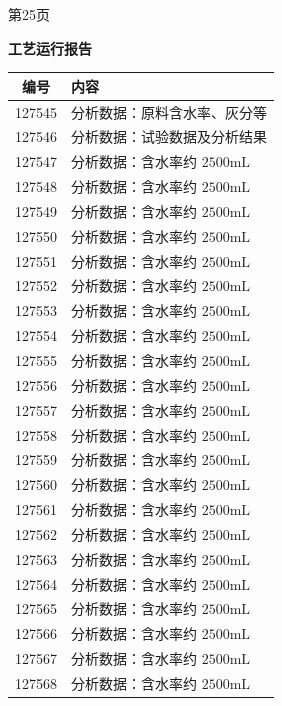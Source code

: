 \documentclass[UTF8,10pt,a4paper,fontset=fandol]{ctexart}
\begin{document}
\begin{center}
\begin{minipage}[t]{0.47\textwidth}
\smallskip
第25页
\end{minipage}
\hfill
\begin{minipage}[t]{0.47\textwidth}
\centering
\textbf{工艺运行报告}

\smallskip
\begin{tabularx}{\linewidth}{|c|X|}
\hline
\textbf{编号} & \textbf{内容} \\ \hline
127545 & 分析数据：原料含水率、灰分等 \\ \hline
127546 & 分析数据：试验数据及分析结果 \\ \hline
127547 & 分析数据：含水率约 $2500\mathrm{mL}$ \\ \hline
127548 & 分析数据：含水率约 $2500\mathrm{mL}$ \\ \hline
127549 & 分析数据：含水率约 $2500\mathrm{mL}$ \\ \hline
127550 & 分析数据：含水率约 $2500\mathrm{mL}$ \\ \hline
127551 & 分析数据：含水率约 $2500\mathrm{mL}$ \\ \hline
127552 & 分析数据：含水率约 $2500\mathrm{mL}$ \\ \hline
127553 & 分析数据：含水率约 $2500\mathrm{mL}$ \\ \hline
127554 & 分析数据：含水率约 $2500\mathrm{mL}$ \\ \hline
127555 & 分析数据：含水率约 $2500\mathrm{mL}$ \\ \hline
127556 & 分析数据：含水率约 $2500\mathrm{mL}$ \\ \hline
127557 & 分析数据：含水率约 $2500\mathrm{mL}$ \\ \hline
127558 & 分析数据：含水率约 $2500\mathrm{mL}$ \\ \hline
127559 & 分析数据：含水率约 $2500\mathrm{mL}$ \\ \hline
127560 & 分析数据：含水率约 $2500\mathrm{mL}$ \\ \hline
127561 & 分析数据：含水率约 $2500\mathrm{mL}$ \\ \hline
127562 & 分析数据：含水率约 $2500\mathrm{mL}$ \\ \hline
127563 & 分析数据：含水率约 $2500\mathrm{mL}$ \\ \hline
127564 & 分析数据：含水率约 $2500\mathrm{mL}$ \\ \hline
127565 & 分析数据：含水率约 $2500\mathrm{mL}$ \\ \hline
127566 & 分析数据：含水率约 $2500\mathrm{mL}$ \\ \hline
127567 & 分析数据：含水率约 $2500\mathrm{mL}$ \\ \hline
127568 & 分析数据：含水率约 $2500\mathrm{mL}$ \\ \hline

\end{tabularx}
\end{minipage}
\end{center}
\end{document}

